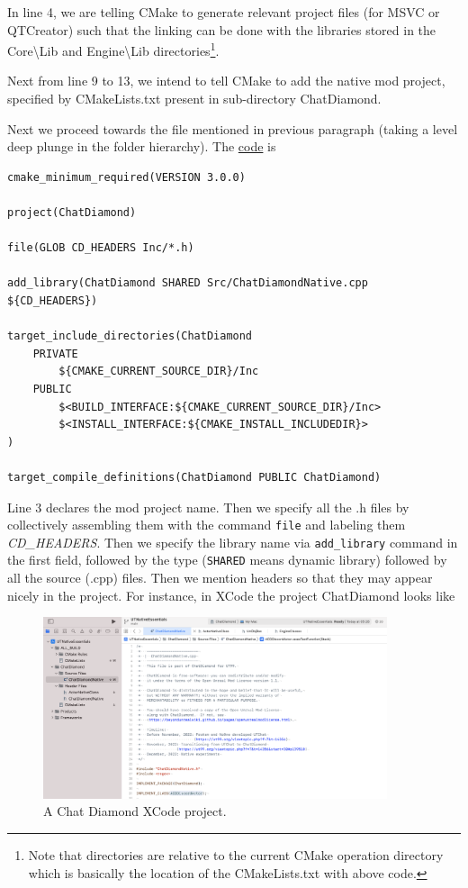 \documentclass{article}
\theoremstyle{definition}
\newcommand{\FileColor}[1]{{\color{Purple} #1}}
\newcommand{\FolderColor}[1]{{\color{mygray} #1}}
\begin{document}
In line 4, we are telling CMake to generate relevant project files (for MSVC or QTCreator) such that the linking can be done with the libraries stored in the \FolderColor{Core\textbackslash Lib} and \FolderColor{Engine\textbackslash Lib} directories\footnote{Note that directories are relative to the current CMake operation directory which is basically the location of the \FileColor{CMakeLists.txt} with above code.}.

Next from line 9 to 13, we intend to tell CMake to add the native mod project, specified by \FileColor{CMakeLists.txt} present in sub-directory \FolderColor{ChatDiamond}.

Next we proceed towards the file mentioned in previous paragraph (taking a level deep plunge in the folder hierarchy).  The \href{https://github.com/ravimohan1991/ChatDiamond/blob/f7950b2591b93a54600459ec58d7ddf57fe9218d/UTNativeEssentials/ChatDiamond/CMakeLists.txt}{code} is
\lstset{language=[5.0]Lua}
\begin{lstlisting}[frame=single]
cmake_minimum_required(VERSION 3.0.0)

project(ChatDiamond)

file(GLOB CD_HEADERS Inc/*.h)

add_library(ChatDiamond SHARED Src/ChatDiamondNative.cpp ${CD_HEADERS})

target_include_directories(ChatDiamond
    PRIVATE
        ${CMAKE_CURRENT_SOURCE_DIR}/Inc
    PUBLIC
        $<BUILD_INTERFACE:${CMAKE_CURRENT_SOURCE_DIR}/Inc>
        $<INSTALL_INTERFACE:${CMAKE_INSTALL_INCLUDEDIR}>
)

target_compile_definitions(ChatDiamond PUBLIC ChatDiamond)
\end{lstlisting}

Line 3 declares the mod project name.  Then we specify all the .h files by collectively assembling them with the command \texttt{file} and labeling them \emph{CD\_HEADERS}.  Then we specify the library name via \texttt{add\_library} command in the first field, followed by the type (\texttt{SHARED} means dynamic library) followed by all the source (.cpp) files.  Then we mention headers so that they may appear nicely in the project.  For instance, in XCode the project ChatDiamond looks like
\begin{figure}
\centering
\includegraphics[width=0.9\textwidth]{chatdiamond_xcode}
\caption{A Chat Diamond XCode project.}
\label{fig:chatdiamond_xcode}
\end{figure}
\end{document}

